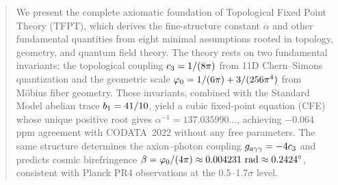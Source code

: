
\maketitle

\begin{abstract}
We present the complete axiomatic foundation of Topological Fixed Point Theory (TFPT), 
which derives the fine-structure constant $\alpha$ and other fundamental quantities 
from eight minimal assumptions rooted in topology, geometry, and quantum field theory. 
The theory rests on two fundamental invariants: the topological coupling 
$\cthree = 1/(8\pi)$ from 11D Chern--Simons quantization and the geometric scale 
$\phiz = 1/(6\pi) + 3/(256\pi^4)$ from M\"obius fiber geometry. 
These invariants, combined with the Standard Model abelian trace $\bone = 41/10$, 
yield a cubic fixed-point equation (CFE) whose unique positive root gives 
$\alpha^{-1} = 137.035990\ldots$, achieving $-0.064$ ppm agreement with CODATA~2022 
without any free parameters. The same structure determines the axion--photon coupling 
$\gagg = -4\cthree$ and predicts cosmic birefringence $\beta = \phiz/(4\pi) \approx 0.004231~\text{rad} \approx 0.2424^\circ$, 
consistent with Planck PR4 observations at the 0.5--1.7$\sigma$ level.
\end{abstract}

